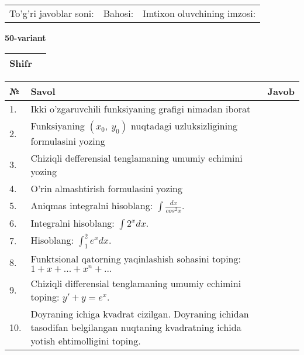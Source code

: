 \documentclass{article}
\begin{document}
  \vspace{1cm}
  
  \begin{tabular}{lll}
  To'g'ri javoblar soni: \underline{\hspace{1.5cm}} & 
  Bahosi: \underline{\hspace{1.5cm}} & 
  Imtixon oluvchining imzosi: \underline{\hspace{2cm}} \\
  \end{tabular}
  
  \egroup
  
  \newpage
  
  
  \textbf{50-variant}\\
  
  \bgroup
  \def\arraystretch{1.6} %
  
  \begin{tabular}{|m{5.7cm}|m{9.5cm}|}
  \hline
  Shifr & \\
  \hline
  \end{tabular}
  
  \vspace{1cm}
  
  \begin{tabular}{|m{0.7cm}|m{10cm}|m{4cm}|}
  \hline
  № & Savol & Javob \\
  \hline
  1. & Ikki o'zgaruvchili funksiyaning grafigi nimadan iborat &  \\
  \hline
  2. & Funksiyaning \((x_{0},\ y_{0})\) nuqtadagi uzluksizligining formulasini yozing &  \\
  \hline
  3. & Chiziqli defferensial tenglamaning umumiy echimini yozing &  \\
  \hline
  4. & O'rin almashtirish formulasini yozing &  \\
  \hline
  5. & Aniqmas integralni hisoblang: \(\int \frac{dx}{cos^{2}x}\). &  \\
  \hline
  6. & Integralni hisoblang: \(\int {2^{x}dx}\). &  \\
  \hline
  7. & Hisoblang: \(\int_{1}^{2}{e^{x}dx}\). &  \\
  \hline
  8. & Funktsional qatorning yaqinlashish sohasini toping:\(1 + x + ... + x^{n} + ...\) &  \\
  \hline
  9. & Chiziqli differensial tenglamaning umumiy echimini toping: \(y' + y = e^{x}\). &  \\
  \hline
  10. & Doyraning ichiga kvadrat cizilgan. Doyraning ichidan tasodifan belgilangan nuqtaning kvadratning ichida yotish ehtimolligini toping. &  \\
  \hline
  \end{tabular}
  
\end{document}
